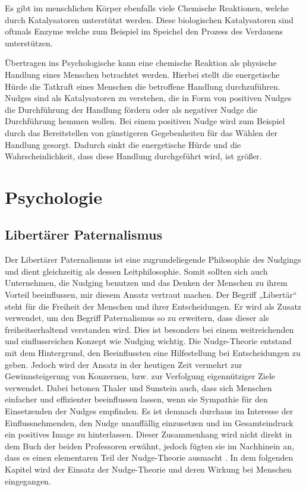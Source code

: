 Es gibt im menschlichen Körper ebenfalls viele Chemische Reaktionen, welche durch Katalysatoren unterstützt werden. Diese biologischen Katalysatoren sind oftmals Enzyme welche zum Beispiel im Speichel den Prozess des Verdauens unterstützen.

Übertragen ins Psychologische kann eine chemische Reaktion als physische Handlung eines Menschen betrachtet werden. Hierbei stellt die energetische Hürde die Tatkraft eines Menschen die betroffene Handlung durchzuführen. Nudges sind als Katalysatoren zu verstehen, die in Form von positiven Nudges die Durchführung der Handlung fördern oder als negativer Nudge die Durchführung hemmen wollen. Bei einem positiven Nudge wird zum Beispiel durch das Bereitstellen von günstigeren Gegebenheiten für das Wählen der Handlung gesorgt. Dadurch sinkt die energetische Hürde und die Wahrscheinlichkeit, dass diese Handlung durchgeführt wird, ist größer.

\section{Psychologie}
\subsection{Libertärer Paternalismus}
Der Libertärer Paternalismus ist eine zugrundeliegende Philosophie des Nudgings und dient gleichzeitig als dessen Leitphilosophie. Somit sollten sich auch Unternehmen, die Nudging benutzen und das Denken der Menschen zu ihrem Vorteil beeinflussen, mir diesem Ansatz vertraut machen.
Der Begriff „Libertär“ steht für die Freiheit der Menschen und ihrer Entscheidungen. Er wird als Zusatz verwendet, um den Begriff Paternalismus so zu erweitern, dass dieser als freiheitserhaltend verstanden wird. Dies ist besonders bei einem weitreichenden und einflussreichen Konzept wie Nudging wichtig. Die Nudge-Theorie entstand mit dem Hintergrund, den Beeinflussten eine Hilfestellung bei Entscheidungen zu geben. Jedoch wird der Ansatz in der heutigen Zeit vermehrt zur Gewinnsteigerung von Konzernen, bzw. zur Verfolgung eigennütziger Ziele verwendet. Dabei betonen Thaler und Sunstein auch, dass sich Menschen einfacher und effizienter beeinflussen lassen, wenn sie Sympathie für den Einsetzenden der Nudges empfinden. Es ist demnach durchaus im Interesse der Einflussnehmenden, den Nudge unauffällig einzusetzen und im Gesamteindruck ein positives Image zu hinterlassen. Dieser Zusammenhang wird nicht direkt in dem Buch der beiden Professoren erwähnt, jedoch fügten sie im Nachhinein an, dass es einen elementaren Teil der Nudge-Theorie ausmacht \parencite{Businessballs.2013}. In dem folgenden Kapitel wird der Einsatz der Nudge-Theorie und deren Wirkung bei Menschen eingegangen. 

